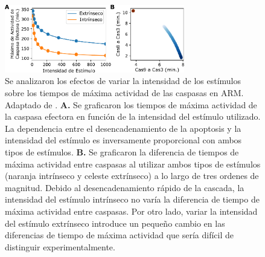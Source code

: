 \begin{figure}
    \centering
    \includegraphics[width=0.7\textwidth]{img/cap_4/barrido_estimulo.pdf}
    \caption{\footnotesize{Se analizaron los efectos de variar la intensidad de los estímulos sobre los tiempos de máxima actividad de las caspasas en ARM.  Adaptado de \cite{Corbat2021}. \textbf{A.} Se graficaron los tiempos de máxima actividad de la caspasa efectora en función de la intensidad del estímulo utilizado. La dependencia entre el desencadenamiento de la apoptosis y la intensidad del estímulo es inversamente proporcional con ambos tipos de estímulos. \textbf{B.} Se graficaron la diferencia de tiempos de máxima actividad entre caspasas al utilizar ambos tipos de estímulos (naranja intrínseco y celeste extrínseco) a lo largo de tres ordenes de magnitud. Debido al desencadenamiento rápido de la cascada, la intensidad del estímulo intrínseco no varía la diferencia de tiempo de máxima actividad entre caspasas. Por otro lado, variar la intensidad del estímulo extrínseco introduce un pequeño cambio en las diferencias de tiempo de máxima actividad que sería difícil de distinguir experimentalmente.}}
    \label{fig:BarridoEstimulo}
\end{figure}

